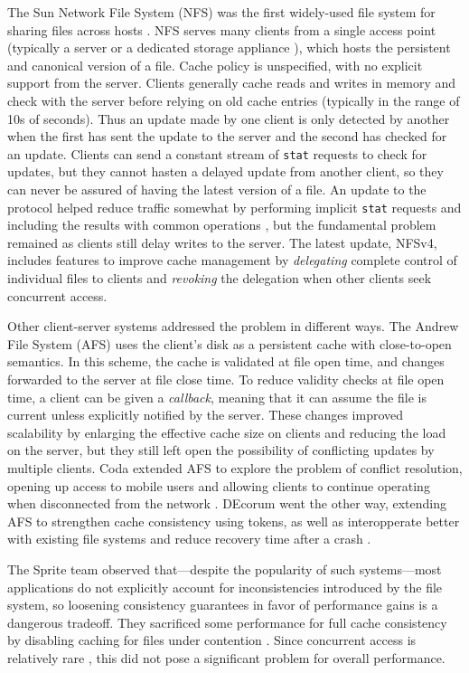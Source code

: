 The Sun Network File System (NFS) was the first widely-used file system for sharing files across hosts \cite{sandberg}. NFS serves many clients from a single access point (typically a server or a dedicated storage appliance \cite{hitz}), which hosts the persistent and canonical version of a file. Cache policy is unspecified, with no explicit support from the server. Clients generally cache reads and writes in memory and check with the server before relying on old cache entries (typically in the range of 10s of seconds). Thus an update made by one client is only detected by another when the first has sent the update to the server and the second has checked for an update. Clients can send a constant stream of \texttt{stat} requests to check for updates, but they cannot hasten a delayed update from another client, so they can never be assured of having the latest version of a file. An update to the protocol helped reduce traffic somewhat by performing implicit \texttt{stat} requests and including the results with common operations \cite{pawlowski,callaghan}, but the fundamental problem remained as clients still delay writes to the server. The latest update, NFSv4, includes features to improve cache management by \emph{delegating} complete control of individual files to clients and \emph{revoking} the delegation when other clients seek concurrent access.

Other client-server systems addressed the problem in different ways. The Andrew File System (AFS) \cite{satyanarayanan85,howard} uses the client's disk as a persistent cache with close-to-open semantics. In this scheme, the cache is validated at file open time, and changes forwarded to the server at file close time. To reduce validity checks at file open time, a client can be given a \emph{callback}, meaning that it can assume the file is current unless explicitly notified by the server. These changes improved scalability by enlarging the effective cache size on clients and reducing the load on the server, but they still left open the possibility of conflicting updates by multiple clients. Coda extended AFS to explore the problem of conflict resolution, opening up access to mobile users and allowing clients to continue operating when disconnected from the network \cite{satyanarayanan90,mummert}. DEcorum went the other way, extending AFS to strengthen cache consistency using tokens, as well as interopperate better with existing file systems and reduce recovery time after a crash \cite{kazar}.

The Sprite team observed that---despite the popularity of such systems---most applications do not explicitly account for inconsistencies introduced by the file system, so loosening consistency guarantees in favor of performance gains is a dangerous tradeoff. They sacrificed some performance for full cache consistency by disabling caching for files under contention \cite{baker91,nelson,welch}. Since concurrent access is relatively rare \cite{kistler}, this did not pose a significant problem for overall performance.


